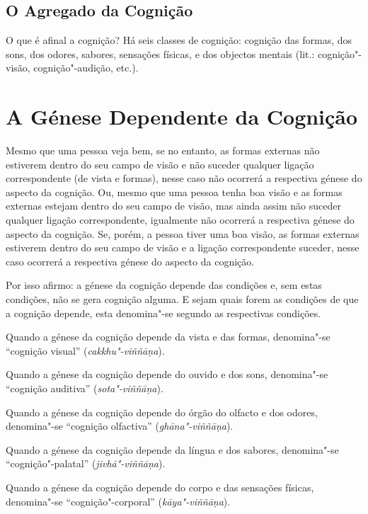 \subsection{O Agregado da Cognição}


O que é afinal a cognição? Há seis classes de cognição: cognição das formas, dos
sons, dos odores, sabores, sensações físicas, e dos objectos mentais (lit.:
cognição"-visão, cognição"-audição, etc.).


\section{A Génese Dependente da Cognição}

Mesmo que uma pessoa veja bem, se no entanto, as formas externas não estiverem
dentro do seu campo de visão e não suceder qualquer ligação correspondente (de
vista e formas), nesse caso não ocorrerá a respectiva génese do aspecto da
cognição. Ou, mesmo que uma pessoa tenha boa visão e as formas externas estejam
dentro do seu campo de visão, mas ainda assim não suceder qualquer ligação
correspondente, igualmente não ocorrerá a respectiva génese do aspecto da
cognição. Se, porém, a pessoa tiver uma boa visão, as formas externas estiverem
dentro do seu campo de visão e a ligação correspondente suceder, nesse caso
ocorrerá a respectiva génese do aspecto da cognição.


Por isso afirmo: a génese da cognição depende das condições e, sem estas
condições, não se gera cognição alguma. E sejam quais forem as condições de que
a cognição depende, esta denomina"-se segundo as respectivas condições.

Quando a génese da cognição depende da vista e das formas, denomina"-se
“cognição visual” (\emph{cakkhu"-viññāṇa}).

Quando a génese da cognição depende do ouvido e dos sons, denomina"-se “cognição
auditiva” (\emph{sota"-viññāṇa}).

Quando a génese da cognição depende do órgão do olfacto e dos odores,
denomina"-se “cognição olfactiva” (\emph{ghāna"-viññāṇa}).

Quando a génese da cognição depende da língua e dos sabores, denomina"-se
“cognição"-palatal” (\emph{jivhā"-viññāṇa}).

Quando a génese da cognição depende do corpo e das sensações físicas,
denomina"-se “cognição"-corporal” (\emph{kāya"-viññāṇa}).

